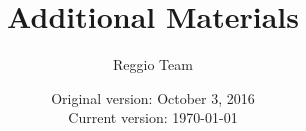 

\setcounter{table}{0}
\renewcommand{\thetable}{A\arabic{table}}
\setcounter{figure}{0}
\renewcommand{\thefigure}{A\arabic{figure}}





\title{\Large \textbf{Additional Materials}}
\author{\normalsize Reggio Team}
\date{\normalsize Original version: October 3, 2016 \\ Current version: \today}
\maketitle

\tableofcontents

\doublespacing

